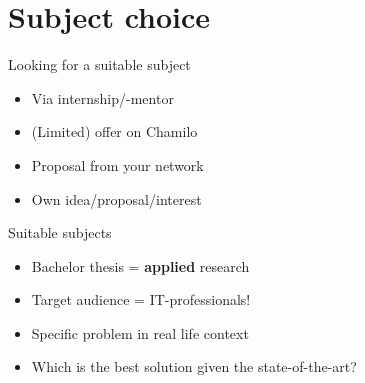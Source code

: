 \documentclass[aspectratio=169]{beamer}
\begin{document}
    \section{Subject choice}
    
    \begin{frame}{Looking for a suitable subject}
        
        \begin{itemize}
            \item Via internship/-mentor
            \item (Limited) offer on Chamilo
            \item Proposal from your network 
            \item Own idea/proposal/interest
        \end{itemize}
        
        \bigskip
        
    \end{frame}
    
    \begin{frame}{Suitable subjects}
        
        \begin{itemize}
            \item Bachelor thesis = \textbf{applied} research
            \item Target audience = IT-professionals!
            \item Specific problem in real life context
            \item Which is the best solution given the state-of-the-art?
        \end{itemize}
        
        \bigskip
        
    \end{frame}
    
\end{document}

